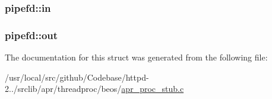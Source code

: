 \subsubsection[{\texorpdfstring{in}{in}}]{ pipefd\+::in}\hypertarget{structpipefd_ac7f1d8a24c8ee8b7a5e5cc0e58aede56}{}\label{structpipefd_ac7f1d8a24c8ee8b7a5e5cc0e58aede56}
\subsubsection[{\texorpdfstring{out}{out}}]{ pipefd\+::out}\hypertarget{structpipefd_a169c0b58f8cf8b02db6b6ce2eb89b002}{}\label{structpipefd_a169c0b58f8cf8b02db6b6ce2eb89b002}


The documentation for this struct was generated from the following file\+:\begin{DoxyCompactItemize}
\item 
/usr/local/src/github/\+Codebase/httpd-\/2../srclib/apr/threadproc/beos/\hyperlink{apr__proc__stub_8c}{apr\+\_\+proc\+\_\+stub.\+c}\end{DoxyCompactItemize}
